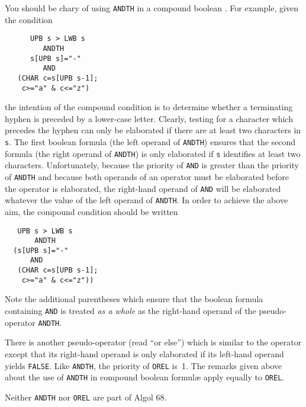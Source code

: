 You should be chary of using \verb|ANDTH| in a compound boolean
. For example, given the condition
\begin{verbatim}
      UPB s > LWB s
         ANDTH
      s[UPB s]="-"
         AND
   (CHAR c=s[UPB s-1];
    c>="a" & c<="z")
\end{verbatim}
\noindent
the intention of the compound condition is to determine whether a
terminating hyphen is preceded by a lower-case letter.  Clearly,
testing for a character which precedes the hyphen can only be
elaborated if there are at least two characters in \verb|s|.  The
first boolean formula (the left operand of \verb|ANDTH|) ensures that
the second formula (the right operand of \verb|ANDTH|) is only
elaborated if \verb|s| identifies at least two characters.
Unfortunately, because the priority of \verb|AND| is greater than the
priority of \verb|ANDTH| and because both operands of an operator
must be elaborated before the operator is elaborated, the right-hand
operand of \verb|AND| will be elaborated whatever the value of the
left operand of \verb|ANDTH|.  In order to achieve the above aim, the
compound condition should be written
\begin{verbatim}
   UPB s > LWB s
       ANDTH
  (s[UPB s]="-"
      AND
   (CHAR c=s[UPB s-1];
    c>="a" & c<="z"))
\end{verbatim}
\noindent
Note the additional parentheses which ensure that the boolean formula
containing \verb|AND| is treated {\it as a whole\/} as the right-hand
operand of the pseudo-operator \verb|ANDTH|.

There is another pseudo-operator  (read ``or else'') which
is similar to the operator  except that its right-hand
operand is only elaborated if its left-hand operand yields
\verb|FALSE|.  Like \verb|ANDTH|, the priority of \verb|OREL| is~1.
The remarks given above about the use of \verb|ANDTH| in compound
boolean formul{\ae} apply equally to \verb|OREL|.

Neither \verb|ANDTH| nor \verb|OREL| are part of Algol 68.

